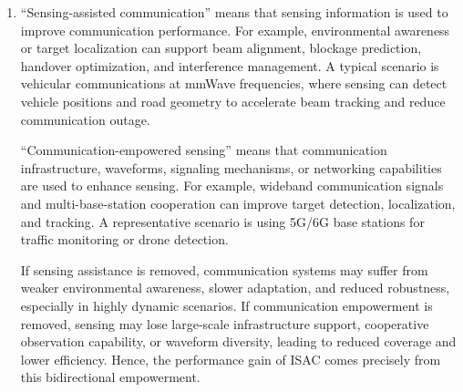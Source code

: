 \begin{enumerate}[label=\textbf{\arabic*.}, leftmargin=*]
    This difference creates unique challenges for ISAC channel modeling.

    First, the model must support \emph{two distinct purposes simultaneously}: it should describe communication propagation loss, fading, and interference, while also preserving target-related structures that can be used for sensing.

    Second, the model must capture both \emph{communication links} and \emph{sensing echoes}. In many cases, this includes direct paths, reflected paths, clutter, multipath components, and dynamic targets.

    Third, ISAC channel models often require \emph{higher geometric and temporal resolution} than traditional communication models, because sensing depends strongly on delay, Doppler, angle, and scattering characteristics.

    Fourth, the model should be \emph{consistent across scales}. For communication, coarse statistical models may sometimes suffice, but sensing often needs parametric or physics-aware models.

    A feasible approach is to build \emph{unified geometry-based stochastic or hybrid channel models} in which common propagation paths serve communication performance analysis, while fine-grained target scattering parameters support sensing tasks. In this way, the same model can describe both the communication channel and the sensing scene in a unified framework.

    \item 
    ``Sensing-assisted communication'' means that sensing information is used to improve communication performance. For example, environmental awareness or target localization can support beam alignment, blockage prediction, handover optimization, and interference management. A typical scenario is vehicular communications at mmWave frequencies, where sensing can detect vehicle positions and road geometry to accelerate beam tracking and reduce communication outage.

    ``Communication-empowered sensing'' means that communication infrastructure, waveforms, signaling mechanisms, or networking capabilities are used to enhance sensing. For example, wideband communication signals and multi-base-station cooperation can improve target detection, localization, and tracking. A representative scenario is using 5G/6G base stations for traffic monitoring or drone detection.

    If sensing assistance is removed, communication systems may suffer from weaker environmental awareness, slower adaptation, and reduced robustness, especially in highly dynamic scenarios. If communication empowerment is removed, sensing may lose large-scale infrastructure support, cooperative observation capability, or waveform diversity, leading to reduced coverage and lower efficiency. Hence, the performance gain of ISAC comes precisely from this bidirectional empowerment.


\end{enumerate}
